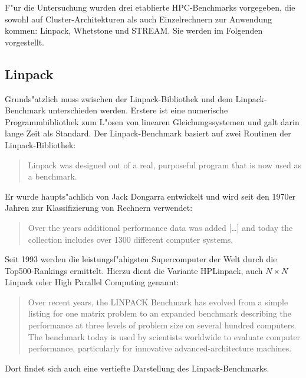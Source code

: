 F"ur die Untersuchung wurden drei etablierte HPC-Benchmarks vorgegeben, die sowohl auf Cluster-Architekturen als auch Einzelrechnern zur Anwendung kommen: Linpack, Whetstone und STREAM. Sie werden im Folgenden vorgestellt. 

\subsection{Linpack}\label{Linpack}

Grunds"atzlich muss zwischen der Linpack-Bibliothek und dem Linpack-Benchmark unterschieden werden. Erstere ist eine numerische Programmbibliothek zum L"osen von linearen Gleichungssystemen und galt darin lange Zeit als Standard. Der Linpack-Benchmark basiert auf zwei Routinen der Linpack-Bibliothek: 
\begin{quote}
\onehalfspacing
Linpack was designed out of a real, purposeful program that is now used as a benchmark. \cite{wei90}
\end{quote}
Er wurde haupts"achlich von Jack Dongarra entwickelt und wird seit den 1970er Jahren zur Klassifizierung von Rechnern verwendet: 
\begin{quote}
\onehalfspacing
Over the years additional performance data was added [\dots] and today the collection includes over 1300 different computer systems. \cite{don03}
\end{quote}
Seit 1993 werden die leistungsf"ahigsten Supercomputer der Welt durch die Top500-Rankings ermittelt. Hierzu dient die Variante HPLinpack, auch $N\times N$ Linpack oder High Parallel Computing genannt:  
\begin{quote}
\onehalfspacing
Over recent years, the LINPACK Benchmark has evolved from a simple listing for one matrix problem to an expanded benchmark describing the performance at three levels of problem size on several hundred computers. The benchmark today is used by scientists worldwide to evaluate computer performance, particularly for innovative advanced-architecture machines. \cite{don03} 
\end{quote}
Dort findet sich auch eine vertiefte Darstellung des Linpack-Benchmarks. 

